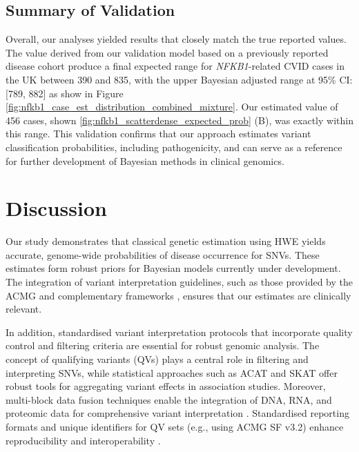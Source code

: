 \subsection{Summary of Validation}
Overall, our analyses yielded results that closely match the true reported values. The value derived from our validation model based on a previously reported disease cohort \cite{tuijnenburgNFKB12018} 
produce a final expected range for \textit{NFKB1}-related CVID cases in the UK between 390 and 835, with the upper Bayesian adjusted range at 95\% CI: [789, 882] as show in Figure
\ref{fig:nfkb1_case_est_distribution_combined_mixture}. 
Our estimated value of 456 cases, shown 
\ref{fig:nfkb1_scatterdense_expected_prob} (B), was exactly within this range.
This validation confirms that our approach estimates variant classification probabilities, including pathogenicity, and can serve as a reference for further development of Bayesian methods in clinical genomics.

\FloatBarrier
\section{Discussion}
Our study demonstrates that classical genetic estimation using HWE yields accurate, genome-wide probabilities of disease occurrence for SNVs. These estimates form robust priors for Bayesian models currently under development. The integration of variant interpretation guidelines, such as those provided by the ACMG \citep{richards2015standards} and complementary frameworks \citep{tavtigian2020fitting,li2017intervar}, ensures that our estimates are clinically relevant.

In addition, standardised variant interpretation protocols that incorporate quality control and filtering criteria \citep{pedersen2021effective,anderson2010data} are essential for robust genomic analysis. The concept of qualifying variants (QVs) \citep{cirulli2015exome,tavtigian2020fitting} plays a central role in filtering and interpreting SNVs, while statistical approaches such as ACAT and SKAT \citep{liu2019acat,li2020dynamic,wu2011rare,lee2012optimal} offer robust tools for aggregating variant effects in association studies. Moreover, multi-block data fusion techniques enable the integration of DNA, RNA, and proteomic data for comprehensive variant interpretation \citep{kong2018nature,howe2021within}. Standardised reporting formats and unique identifiers for QV sets (e.g., using ACMG SF v3.2) enhance reproducibility and interoperability \citep{miller2023acmg}.

